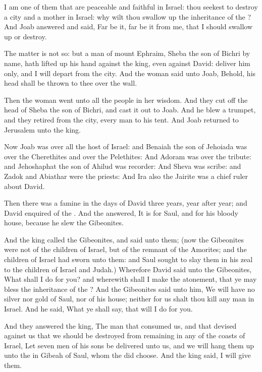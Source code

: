 \Verse I am one of them that are peaceable and faithful in Israel: thou seekest to destroy a city and a mother in Israel: why wilt thou swallow up the inheritance of the \LORD?  \Verse And Joab answered and said, Far be it, far be it from me, that I should swallow up or destroy.

\Verse The matter is not so: but a man of mount Ephraim, Sheba the son of Bichri by name, hath lifted up his hand against the king, even against David: deliver him only, and I will depart from the city. And the woman said unto Joab, Behold, his head shall be thrown to thee over the wall.

\Verse Then the woman went unto all the people in her wisdom. And they cut off the head of Sheba the son of Bichri, and cast it out to Joab.  And he blew a trumpet, and they retired from the city, every man to his tent. And Joab returned to Jerusalem unto the king.

\Verse Now Joab was over all the host of Israel: and Benaiah the son of Jehoiada was over the Cherethites and over the Pelethites: \Verse And Adoram was over the tribute: and Jehoshaphat the son of Ahilud was recorder: \Verse And Sheva was scribe: and Zadok and Abiathar were the priests: \Verse And Ira also the Jairite was a chief ruler about David.


\Chapter
\Verse Then there was a famine in the days of David three years, year after year; and David enquired of the \LORD. And the \LORD answered, It is for Saul, and for his bloody house, because he slew the Gibeonites.

\Verse And the king called the Gibeonites, and said unto them; (now the Gibeonites were not of the children of Israel, but of the remnant of the Amorites; and the children of Israel had sworn unto them: and Saul sought to slay them in his zeal to the children of Israel and Judah.)  \Verse Wherefore David said unto the Gibeonites, What shall I do for you?  and wherewith shall I make the atonement, that ye may bless the inheritance of the \LORD?  \Verse And the Gibeonites said unto him, We will have no silver nor gold of Saul, nor of his house; neither for us shalt thou kill any man in Israel. And he said, What ye shall say, that will I do for you.

\Verse And they answered the king, The man that consumed us, and that devised against us that we should be destroyed from remaining in any of the coasts of Israel, \Verse Let seven men of his sons be delivered unto us, and we will hang them up unto the \LORD in Gibeah of Saul, whom the \LORD did choose. And the king said, I will give them.

